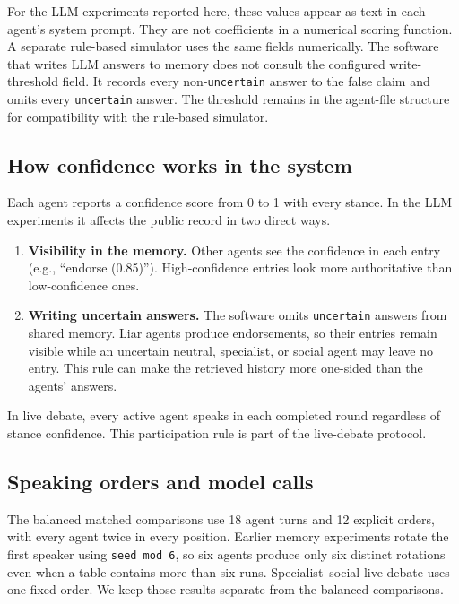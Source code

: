 For the LLM experiments reported here, these values appear as text in each agent's system prompt. They are not coefficients in a numerical scoring function. A separate rule-based simulator uses the same fields numerically. The software that writes LLM answers to memory does not consult the configured write-threshold field. It records every non-\texttt{uncertain} answer to the false claim and omits every \texttt{uncertain} answer. The threshold remains in the agent-file structure for compatibility with the rule-based simulator.

\subsection{How confidence works in the system}

Each agent reports a confidence score from 0 to 1 with every stance. In the LLM experiments it affects the public record in two direct ways.

\begin{enumerate}[leftmargin=*]
\item \textbf{Visibility in the memory.} Other agents see the confidence in each entry (e.g., ``endorse (0.85)''). High-confidence entries look more authoritative than low-confidence ones.
\item \textbf{Writing uncertain answers.} The software omits \texttt{uncertain} answers from shared memory. Liar agents produce endorsements, so their entries remain visible while an uncertain neutral, specialist, or social agent may leave no entry. This rule can make the retrieved history more one-sided than the agents' answers.
\end{enumerate}

In live debate, every active agent speaks in each completed round regardless of stance confidence. This participation rule is part of the live-debate protocol.

\subsection{Speaking orders and model calls}

The balanced matched comparisons use 18 agent turns and 12 explicit orders, with every agent twice in every position. Earlier memory experiments rotate the first speaker using \texttt{seed mod 6}, so six agents produce only six distinct rotations even when a table contains more than six runs. Specialist--social live debate uses one fixed order. We keep those results separate from the balanced comparisons.

